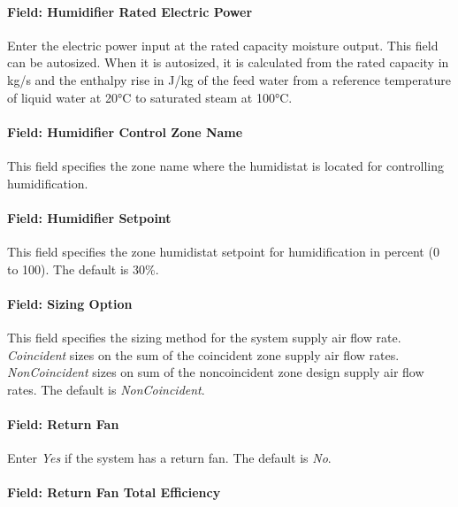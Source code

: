 \paragraph{Field: Humidifier Rated Electric Power}\label{field-humidifier-rated-electric-power-3}

Enter the electric power input at the rated capacity moisture output. This field can be autosized. When it is autosized, it is calculated from the rated capacity in kg/s and the enthalpy rise in J/kg of the feed water from a reference temperature of liquid water at 20°C to saturated steam at 100°C.

\paragraph{Field: Humidifier Control Zone Name}\label{field-humidifier-control-zone-name-3}

This field specifies the zone name where the humidistat is located for controlling humidification.

\paragraph{Field: Humidifier Setpoint}\label{field-humidifier-setpoint-2}

This field specifies the zone humidistat setpoint for humidification in percent (0 to 100). The default is 30\%.

\paragraph{Field: Sizing Option}\label{field-sizing-option-1}

This field specifies the sizing method for the system supply air flow rate. \emph{Coincident} sizes on the sum of the coincident zone supply air flow rates. \emph{NonCoincident} sizes on sum of the noncoincident zone design supply air flow rates. The default is \emph{NonCoincident}.

\paragraph{Field: Return Fan}\label{field-return-fan-1}

Enter \emph{Yes} if the system has a return fan. The default is \emph{No}.

\paragraph{Field: Return Fan Total Efficiency}\label{field-return-fan-total-efficiency-1}

